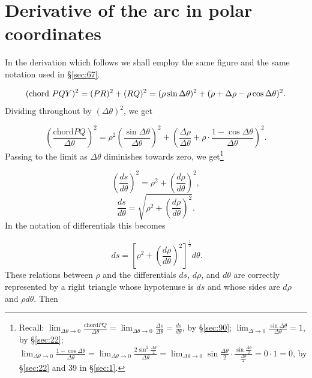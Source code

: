 \section{Derivative of the arc in polar coordinates}

In the derivation which follows
we shall employ the same figure and the same notation 
used in \S \ref{sec:67}. %


\[
({\rm chord}\ PQY)^2 	= (PR)^2 + (RQ)^2
  	= (\rho\sin \Delta \theta)^2 + 
(\rho +  \Delta \rho - \rho\cos \Delta \theta)^2.
\]
Dividing throughout by $(\Delta \theta)^2$, we get

\[
\left( \frac{\mbox{chord} PQ}{\Delta \theta} \right)^2 
= \rho^2 \left( \frac{\sin \Delta \theta}{\Delta \theta} \right)^2 
+ \left( \frac{\Delta \rho}{\Delta \theta} + \rho \cdot 
\frac{1 - \cos \Delta \theta}{\Delta \theta} \right)^2.
\]
Passing to the limit as $\Delta \theta$ diminishes towards zero, 
we get\footnote{Recall: 
$\lim_{\Delta \theta \to 0} \frac{\mbox{chord} PQ}{\Delta \theta} 
= \lim_{\Delta \theta \to 0} \frac{\Delta s}{\Delta \theta} 
= \frac{ds}{d\theta}$, by \S \ref{sec:90};%
$\lim_{\Delta \to 0} \frac{\sin \Delta \theta}{\Delta \theta} = 1$,
by \S \ref{sec:22}; %
$\lim_{\Delta \theta \to 0} 
\frac{1 - \cos \Delta \theta}{\Delta \theta} 
= \lim_{\Delta \theta \to 0} 
\frac{2 \sin^2 \frac{\Delta \theta}{2}}{\Delta \theta} 
= \lim_{\Delta \theta \to 0} 
\sin \frac{\Delta \theta}{2} \cdot 
\frac{\sin \frac{\Delta \theta}{2}}{\frac{\Delta \theta}{2}} 
= 0 \cdot 1 = 0$, by \S \ref{sec:22} and 39 in \S \ref{sec:1}.
}

\[
\left( \frac{ds}{d\theta} \right)^2 	
= \rho^2 + \left ( \frac{d\rho}{d\theta} \right )^2,
\]
\begin{equation}
\frac{ds}{d\theta}= \sqrt{\rho^2 + 
\left ( \frac{d\rho}{d\theta} \right )^2}.
\label{eqn:30-91}
\end{equation}
In the notation of differentials this becomes

\begin{equation}
\ ds =	
\left[ \rho^2 + 
\left( \frac{d\rho}{d\theta} \right)^2 \right]^{\frac{1}{2}} d\theta.
\label{eqn:31-91}
\end{equation}
These relations between $\rho$ and the differentials 
$ds$, $d\rho$, and $d\theta$ are correctly represented by 
a right triangle whose hypotenuse is $ds$ and whose sides are 
$d\rho$ and $\rho d\theta$. Then

